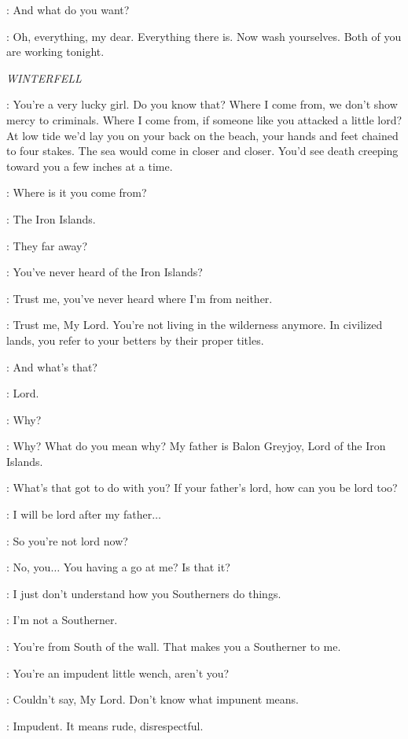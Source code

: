 \ROS: And what do you want? 

\LITTLEFINGER: Oh, everything, my dear. Everything there is. Now wash yourselves. Both of you are working tonight. 


\scene

\textit{WINTERFELL} 


\THEON: You're a very lucky girl. Do you know that? Where I come from, we don't show mercy to criminals. Where I come from, if someone like you attacked a little lord? At low tide we'd lay you on your back on the beach, your hands and feet chained to four stakes. The sea would come in closer and closer. You'd see death creeping toward you a few inches at a time. 

\OSHA: Where is it you come from? 

\THEON: The Iron Islands. 

\OSHA: They far away? 

\THEON: You've never heard of the Iron Islands? 

\OSHA: Trust me, you've never heard where I'm from neither. 

\THEON: Trust me, My Lord. You're not living in the wilderness anymore. In civilized lands, you refer to your betters by their proper titles. 

\OSHA: And what's that? 

\THEON: Lord. 

\OSHA: Why? 

\THEON: Why? What do you mean why? My father is Balon Greyjoy, Lord of the Iron Islands. 

\OSHA: What's that got to do with you? If your father's lord, how can you be lord too? 

\THEON: I will be lord after my father$\ldots$ 

\OSHA: So you're not lord now? 

\THEON: No, you$\ldots$ You having a go at me? Is that it? 

\OSHA: I just don't understand how you Southerners do things. 

\THEON: I'm not a Southerner. 

\OSHA: You're from South of the wall. That makes you a Southerner to me. 

\THEON: You're an impudent little wench, aren't you? 

\OSHA: Couldn't say, My Lord. Don't know what impunent means. 

\THEON: Impudent. It means rude, disrespectful. 

